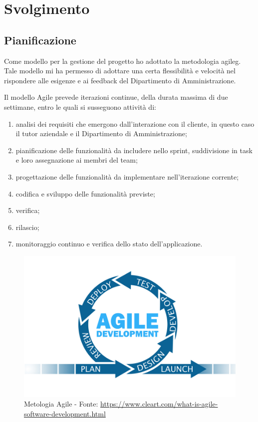 
\chapter{Svolgimento}
\label{cap:svolgimento}


\section{Pianificazione}
	Come modello per la gestione del progetto ho adottato la metodologia \gls{agileg}. Tale
	modello mi ha permesso di adottare una certa flessibilità e velocità nel rispondere alle
	esigenze e ai feedback del Dipartimento di Amministrazione.
	
	Il modello Agile prevede iterazioni continue, della durata massima di due settimane,
	entro le quali si susseguono attività di:
	\begin{enumerate}
		\item analisi dei requisiti che emergono dall’interazione con il cliente, in questo caso il tutor aziendale e il Dipartimento di Amministrazione;
		\item pianificazione delle funzionalità da includere nello sprint, suddivisione in task e loro assegnazione ai membri del team;
		\item progettazione delle funzionalità da implementare nell’iterazione corrente;
		\item codifica e sviluppo delle funzionalità previste;
		\item verifica;
		\item rilascio;
		\item monitoraggio continuo e verifica dello stato dell’applicazione.
	\end{enumerate}

		\begin{figure}
			\centering
			\includegraphics[width=0.7\linewidth]{immagini/agile}
			\caption{Metologia Agile - Fonte: \url{https://www.cleart.com/what-is-agile-software-development.html}}
			\label{fig:agile}
		\end{figure}
		

